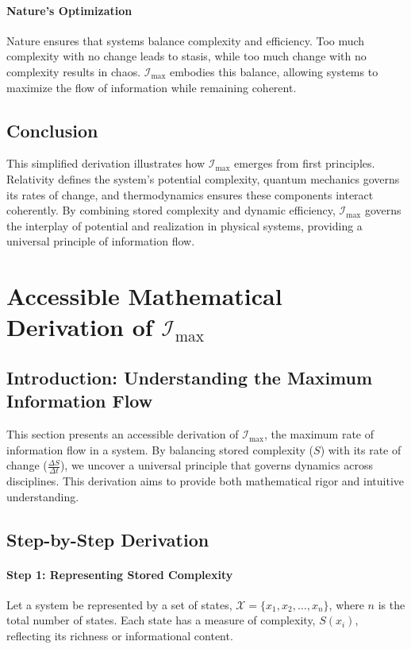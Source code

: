 \documentclass[12pt]{article}
\begin{document}
\paragraph{Nature’s Optimization}
Nature ensures that systems balance complexity and efficiency. Too much complexity with no change leads to stasis, while too much change with no complexity results in chaos. \(\mathcal{I}_{\text{max}}\) embodies this balance, allowing systems to maximize the flow of information while remaining coherent.

\subsection{Conclusion}
This simplified derivation illustrates how \(\mathcal{I}_{\text{max}}\) emerges from first principles. Relativity defines the system’s potential complexity, quantum mechanics governs its rates of change, and thermodynamics ensures these components interact coherently. By combining stored complexity and dynamic efficiency, \(\mathcal{I}_{\text{max}}\) governs the interplay of potential and realization in physical systems, providing a universal principle of information flow.



\section{Accessible Mathematical Derivation of \(\mathcal{I}_{\text{max}}\)}

\subsection{Introduction: Understanding the Maximum Information Flow}
This section presents an accessible derivation of \(\mathcal{I}_{\text{max}}\), the maximum rate of information flow in a system. By balancing stored complexity (\(S\)) with its rate of change (\(\frac{\Delta S}{\Delta t}\)), we uncover a universal principle that governs dynamics across disciplines. This derivation aims to provide both mathematical rigor and intuitive understanding.

\subsection{Step-by-Step Derivation}

\paragraph{Step 1: Representing Stored Complexity}
Let a system be represented by a set of states, \(\mathcal{X} = \{x_1, x_2, \ldots, x_n\}\), where \(n\) is the total number of states. Each state has a measure of complexity, \(S(x_i)\), reflecting its richness or informational content.
\end{document}
